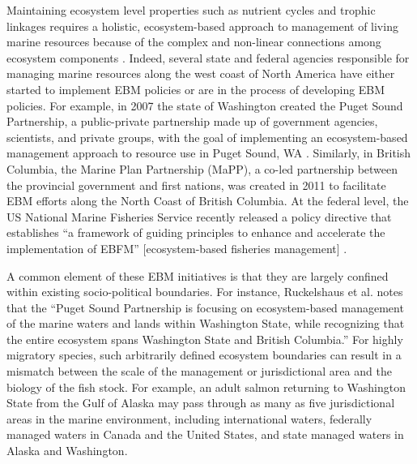 Maintaining ecosystem level properties such as nutrient cycles and
trophic linkages requires a holistic, ecosystem-based approach to
management of living marine resources because of the complex and
non-linear connections among ecosystem components \citep{Engler2015}.
Indeed, several state and federal agencies responsible for managing
marine resources along the west coast of North America have either
started to implement EBM policies or are in the process of developing
EBM policies. For example, in 2007 the state of Washington created the
Puget Sound Partnership, a public-private partnership made up of
government agencies, scientists, and private groups, with the goal of
implementing an ecosystem-based management approach to resource use in
Puget Sound, WA \citep{Ruckelshaus2009, Samhouri2011a}. Similarly, in
British Columbia, the Marine Plan Partnership (MaPP), a co-led
partnership between the provincial government and first nations, was
created in 2011 to facilitate EBM efforts along the North Coast of
British Columbia. At the federal level, the US National Marine Fisheries
Service recently released a policy directive that establishes ``a
framework of guiding principles to enhance and accelerate the
implementation of EBFM'' {[}ecosystem-based fisheries management{]}
\citep{NMFS2016}.

A common element of these EBM initiatives is that they are largely
confined within existing socio-political boundaries. For instance,
Ruckelshaus et al. \citet{Ruckelshaus2009} notes that the ``Puget Sound
Partnership is focusing on ecosystem-based management of the marine
waters and lands within Washington State, while recognizing that the
entire ecosystem spans Washington State and British Columbia.'' For
highly migratory species, such arbitrarily defined ecosystem boundaries
can result in a mismatch between the scale of the management or
jurisdictional area and the biology of the fish stock. For example, an
adult salmon returning to Washington State from the Gulf of Alaska may
pass through as many as five jurisdictional areas in the marine
environment, including international waters, federally managed waters in
Canada and the United States, and state managed waters in Alaska and
Washington.

